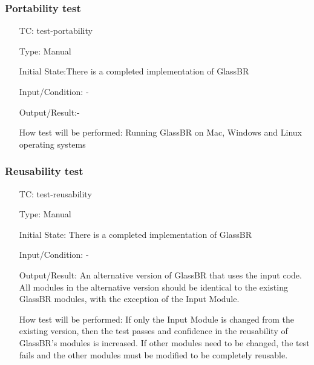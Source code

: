 \documentclass[12pt, titlepage]{article}
\newcounter{testnum} %
\newcommand{\progname}{GlassBR}
\begin{document}
\subsubsection{Portability test}

\begin{enumerate}[label=TC\arabic*:,ref={\arabic*}]
	
\item [TC\refstepcounter{testnum}\thetestnum: \label{TC_Portability}] 
test-portability

Type: Manual
					
Initial State:There is a completed implementation of \progname{}
					
Input/Condition: -
					
Output/Result:-

					
How test will be performed: Running \progname{} on Mac, Windows and
Linux operating systems 
					
\end{enumerate}

\subsubsection{Reusability test}

\begin{enumerate}[label=TC\arabic*:,ref={\arabic*}]
	
\item [TC\refstepcounter{testnum}\thetestnum: \label{TC_Reusability}] 
test-reusability

Type: Manual

Initial State: There is a completed implementation of \progname{}
	
Input/Condition: -

Output/Result: An alternative version of \progname{} that uses the input code. 
All modules in the alternative version should be identical to the existing 
\progname{} modules, with the exception of the Input Module.

How test will be performed:  If only the Input Module is changed from the 
existing version, then the test passes and confidence in the reusability of 
\progname{}'s modules is increased. If other modules need to be changed, the 
test fails and the other modules must be modified to be completely reusable.
	
\end{enumerate}
\end{document}
